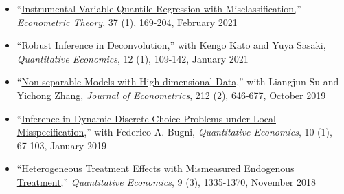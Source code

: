 \documentclass{article}
\begin{document}
\begin{itemize}
\item[] ``\href{https://doi.org/10.1017/S026646662000002X}{Instrumental Variable Quantile Regression with Misclassification,}'' \textit{Econometric Theory}, 37 (1), 169-204, February 2021 
\item[] ``\href{https://doi.org/10.3982/QE1643}{Robust Inference in Deconvolution,}''  with Kengo Kato and Yuya Sasaki, \textit{Quantitative Economics}, 12 (1), 109-142, January 2021  
\item[] ``\href{https://doi.org/10.1016/j.jeconom.2019.06.004}{Non-separable Models with High-dimensional Data,}'' with Liangjun Su and Yichong Zhang, \textit{Journal of Econometrics}, 212 (2), 646-677, October 2019 
\item[] ``\href{https://doi.org/10.3982/QE917}{Inference in Dynamic Discrete Choice Problems under Local Misspecification,}'' with Federico A. Bugni, \textit{Quantitative Economics}, 10 (1), 67-103, January 2019
\item[] ``\href{https://doi.org/10.3982/QE886}{Heterogeneous Treatment Effects with Mismeasured Endogenous Treatment,}'' \textit{Quantitative Economics}, 9 (3), 1335-1370, November 2018
\end{itemize}

 
\end{document}
